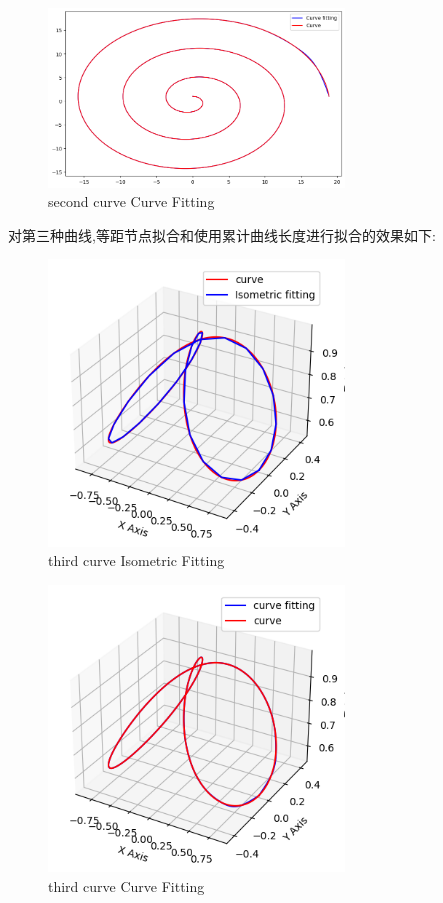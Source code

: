 \documentclass[a4paper]{article}
\begin{document}
\begin{figure}[H]
    \centering
    \includegraphics[width=0.7\textwidth]{E2_CurveFitting.png}
    \caption{second curve Curve Fitting}
    \label{Fig}
\end{figure}
对第三种曲线,等距节点拟合和使用累计曲线长度进行拟合的效果如下:
\begin{figure}[H]
    \centering
    \includegraphics[width=0.7\textwidth]{E3_IsometricFitting.png}
    \caption{third curve Isometric Fitting}
    \label{Fig}
\end{figure}
\begin{figure}[H]
    \centering
    \includegraphics[width=0.7\textwidth]{E3_CurveFitting.png}
    \caption{third curve Curve Fitting}
    \label{Fig}
\end{figure}
\end{document}
